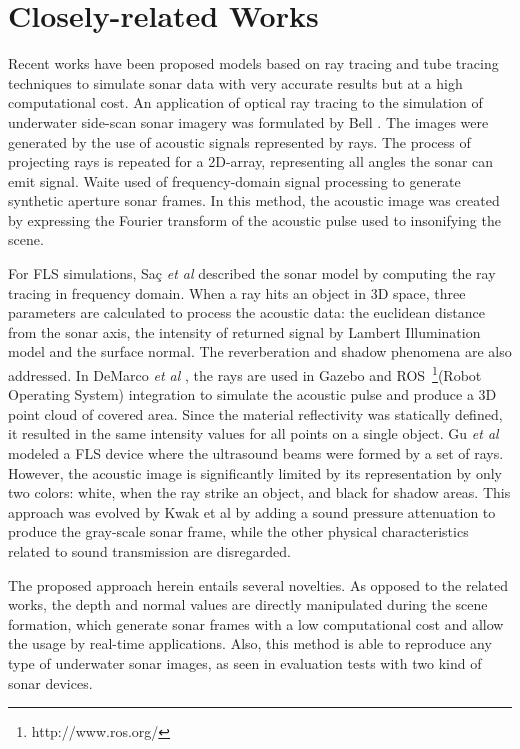 \documentclass[final,5p,times]{elsarticle}
\begin{document}
\section{Closely-related Works}
\label{relatedworks}

Recent works have been proposed models based on ray tracing and tube tracing techniques to simulate sonar data with very accurate results but at a high computational cost. An application of optical ray tracing to the simulation of underwater side-scan sonar imagery was formulated by Bell \cite{bell1997}. The images were generated by the use of acoustic signals represented by rays. The process of projecting rays is repeated for a 2D-array, representing all angles the sonar can emit signal. Waite \cite{waite2002} used of frequency-domain signal processing to generate synthetic aperture sonar frames. In this method, the acoustic image was created by expressing the Fourier transform of the acoustic pulse used to insonifying the scene.

For FLS simulations, Saç \textit{et al} \cite{sac2015} described the sonar model by computing the ray tracing in frequency domain. When a ray hits an object in 3D space, three parameters are calculated to process the acoustic data: the euclidean distance from the sonar axis, the intensity of returned signal by Lambert Illumination model and the surface normal. The reverberation and shadow phenomena are also addressed. In DeMarco \textit{et al} \cite{demarco2015}, the rays are used in Gazebo and ROS~\footnote{http://www.ros.org/}(Robot Operating System) integration to simulate the acoustic pulse and produce a 3D point cloud of covered area. Since the material reflectivity was statically defined, it resulted in the same intensity values for all points on a single object. Gu \textit{et al} \cite{gu2013} modeled a FLS device where the ultrasound beams were formed by a set of rays. However, the acoustic image is significantly limited by its representation by only two colors: white, when the ray strike an object, and black for shadow areas. This approach was evolved by Kwak et al \cite{kwak2015} by adding a sound pressure attenuation to produce the gray-scale sonar frame, while the other physical characteristics related to sound transmission are disregarded.

The proposed approach herein entails several novelties. As opposed to the related works, the depth and normal values are directly manipulated during the scene formation, which generate sonar frames with a low computational cost and allow the usage by real-time applications. Also, this method is able to reproduce any type of underwater sonar images, as seen in evaluation tests with two kind of sonar devices.
\end{document}
